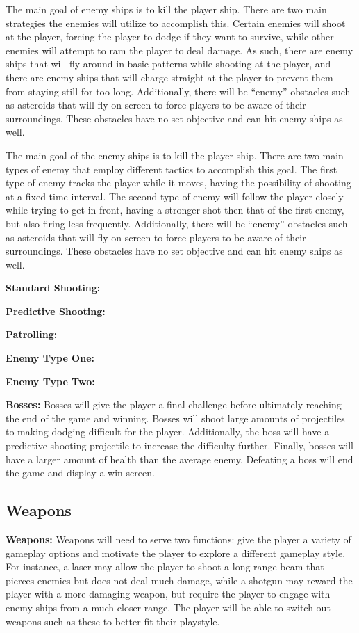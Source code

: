 \documentclass[12pt]{article}       %
\def\hs{\hspace{15pt}}
\begin{document}
	\hs {\bf Enemies: } The main goal of enemy ships is to kill the player ship. There are two main strategies the enemies will utilize to accomplish this. Certain enemies will shoot at the player, forcing the player to dodge if they want to survive, while other enemies will attempt to ram the player to deal damage. As such, there are enemy ships that will fly around in basic patterns while shooting at the player, and there are enemy ships that will charge straight at the player to prevent them from staying still for too long. Additionally, there will be “enemy” obstacles such as asteroids that will fly on screen to force players to be aware of their surroundings. These obstacles have no set objective and can hit enemy ships as well.

	The main goal of the enemy ships is to kill the player ship. There are two main types of enemy that employ different tactics to accomplish this goal. The first type of enemy tracks the player while it moves, having the possibility of shooting at a fixed time interval. The second type of enemy will follow the player closely while trying to get in front, having a stronger shot then that of the first enemy, but also firing less frequently. Additionally, there will be “enemy” obstacles such as asteroids that will fly on screen to force players to be aware of their surroundings. These obstacles have no set objective and can hit enemy ships as well.

	{\bf Standard Shooting:}

	{\bf Predictive Shooting:} 

	{\bf Patrolling:}

	{\bf Enemy Type One:}

	{\bf Enemy Type Two:}

	{\bf Bosses:} Bosses will give the player a final challenge before ultimately reaching the end of the game and winning. Bosses will shoot large amounts of projectiles to making dodging difficult for the player. Additionally, the boss will have a predictive shooting projectile to increase the difficulty further. Finally, bosses will have a larger amount of health than the average enemy. Defeating a boss will end the game and display a win screen.

\subsection{Weapons} %

	{\bf Weapons:} Weapons will need to serve two functions: give the player a variety of gameplay options and motivate the player to explore a different gameplay style. For instance, a laser may allow the player to shoot a long range beam that pierces enemies but does not deal much damage, while a shotgun may reward the player with a more damaging weapon, but require the player to engage with enemy ships from a much closer range. The player will be able to switch out weapons such as these to better fit their playstyle.
\end{document}
